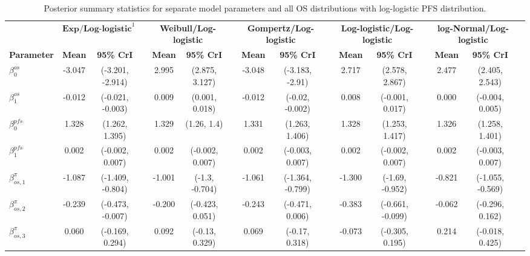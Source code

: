 \documentclass[AMA,STIX1COL]{WileyNJD-v2}
\begin{document}
\begin{landscape}
\begin{center}
\begin{table}[t]
\caption{Posterior summary statistics for separate model parameters and all OS distributions with log-logistic PFS distribution. \label{tab:post_sep_pfs_llogistic}}
\centering
\begin{tabular}{l c c c c c c c c c c c c c c c}
\toprule
\multicolumn{1}{l}{} & \multicolumn{2}{c}{$\textbf{Exp/Log-logistic}^1$} & & \multicolumn{2}{c}{\textbf{Weibull/Log-logistic}} & & \multicolumn{2}{c}{\textbf{Gompertz/Log-logistic}} & & \multicolumn{2}{c}{\textbf{Log-logistic/Log-logistic}} & & \multicolumn{2}{c}{\textbf{log-Normal/Log-logistic}}\\
\cmidrule{2-3}\cmidrule{5-6}\cmidrule{8-9}\cmidrule{11-12}\cmidrule{14-15}
\textbf{Parameter} & \textbf{Mean} & \textbf{95\% CrI} & & \textbf{Mean} & \textbf{95\% CrI} & & \textbf{Mean} & \textbf{95\% CrI} & & \textbf{Mean} & \textbf{95\% CrI} & & \textbf{Mean} & \textbf{95\% CrI}\\
\midrule
$\beta^{os}_0$ & -3.047 & (-3.201, -2.914) &  & 2.995 & (2.875, 3.127) &  & -3.048 & (-3.183, -2.91) &  & 2.717 & (2.578, 2.867) &  & 2.477 & (2.405, 2.543) & \\
$\beta^{os}_1$ & -0.012 & (-0.021, -0.003) &  & 0.009 & (0.001, 0.018) &  & -0.012 & (-0.02, -0.002) &  & 0.008 & (-0.001, 0.017) &  & 0.000 & (-0.004, 0.005) & \\
$\beta^{pfs}_0$ & 1.328 & (1.262, 1.395) &  & 1.329 & (1.26, 1.4) &  & 1.331 & (1.263, 1.406) &  & 1.328 & (1.253, 1.417) &  & 1.326 & (1.258, 1.401) & \\
$\beta^{pfs}_1$ & 0.002 & (-0.002, 0.007) &  & 0.002 & (-0.002, 0.007) &  & 0.002 & (-0.003, 0.007) &  & 0.002 & (-0.002, 0.007) &  & 0.002 & (-0.003, 0.007) & \\
$\beta^{\pi}_{os, 1}$ & -1.087 & (-1.409, -0.804) &  & -1.001 & (-1.3, -0.704) &  & -1.061 & (-1.364, -0.799) &  & -1.300 & (-1.69, -0.952) &  & -0.821 & (-1.055, -0.569) & \\
$\beta^{\pi}_{os, 2}$ & -0.239 & (-0.473, -0.007) &  & -0.200 & (-0.423, 0.051) &  & -0.243 & (-0.471, 0.006) &  & -0.383 & (-0.661, -0.099) &  & -0.062 & (-0.296, 0.162) & \\
$\beta^{\pi}_{os, 3}$ & 0.060 & (-0.169, 0.294) &  & 0.092 & (-0.13, 0.329) &  & 0.069 & (-0.17, 0.318) &  & -0.073 & (-0.305, 0.195) &  & 0.214 & (-0.018, 0.425) & \\

\end{tabular}
\end{table}
\end{center}
\end{landscape}
\end{document}
